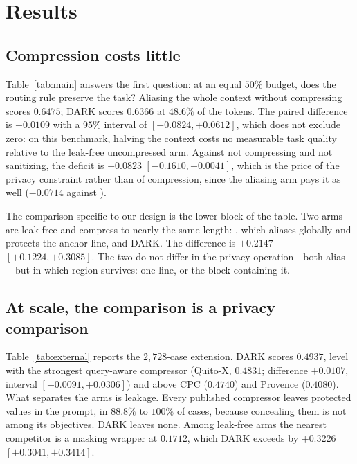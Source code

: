 \section{Results}
\label{sec:results}



\subsection{Compression costs little}

Table~\ref{tab:main} answers the first question: at an equal $50\%$ budget, does the routing
rule preserve the task? Aliasing the whole context without compressing scores $0.6475$;
\textsc{DARK} scores $0.6366$ at $48.6\%$ of the tokens. The paired difference is
$-0.0109$ with a $95\%$ interval of $[-0.0824,+0.0612]$, which does not exclude zero: on
this benchmark, halving the context costs no measurable task quality relative to the
leak-free uncompressed arm. Against not compressing and not sanitizing, the deficit is
$-0.0823$ $[-0.1610,-0.0041]$, which is the price of the privacy constraint rather than of
compression, since the aliasing arm pays it as well ($-0.0714$ against ).

The comparison specific to our design is the lower block of the table. Two arms are
leak-free and compress to nearly the same length: , which aliases
globally and protects the anchor line, and \textsc{DARK}. The difference is $+0.2147$
$[+0.1224,+0.3085]$. The two do not differ in the privacy operation---both alias---but in
which region survives: one line, or the block containing it.



\subsection{At scale, the comparison is a privacy comparison}

Table~\ref{tab:external} reports the $2{,}728$-case extension. \textsc{DARK} scores
$0.4937$, level with the strongest query-aware compressor (Quito-X, $0.4831$; difference
$+0.0107$, interval $[-0.0091,+0.0306]$) and above CPC ($0.4740$) and Provence ($0.4080$).
What separates the arms is leakage. Every published compressor leaves protected values in
the prompt, in $88.8\%$ to $100\%$ of cases, because concealing them is not among its
objectives. \textsc{DARK} leaves none. Among leak-free arms the nearest competitor is a
masking wrapper at $0.1712$, which \textsc{DARK} exceeds by $+0.3226$
$[+0.3041,+0.3414]$.

